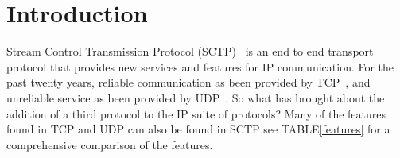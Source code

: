 \documentclass[conference]{IEEEtran}
\begin{document}




%



\section{Introduction}
Stream Control Transmission Protocol (SCTP)~\cite{rfc4960} is an end to end transport protocol that provides new services and features for IP communication.
For the past twenty years, reliable communication as been provided by TCP~\cite{rfc793}, and unreliable service as been provided by UDP~\cite{rfc768}.
So what has brought about the addition of a third protocol to the IP suite of protocols? Many of the features found in TCP and UDP can also be found in SCTP
see TABLE\ref{features} for a comprehensive comparison of the features. 
\end{document}
